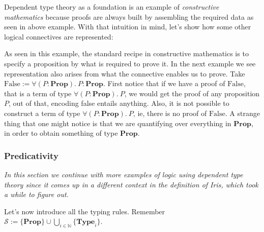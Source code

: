 Dependent type theory as a foundation is an example of \emph{constructive mathematics} because proofs are always built by assembling the required data as seen in
above example. With that intuition in mind, let's show how some other logical connectives are represented:

As seen in this example, the standard recipe in constructive mathematics is to specify a proposition by what is required to prove it. In the next example we
see representation also arises from what the connective enables us to prove. Take $\mathrm{False} := \forall (P : \mathbf{Prop}).\ P : \mathbf{Prop}$.
First notice that if we have a proof of $\mathrm{False}$, that is a term of type $\forall (P : \mathbf{Prop}).\ P$, we would get the proof of any proposition $P$,
out of that, encoding false entails anything. Also, it is not possible to construct a term of type $\forall (P : \mathbf{Prop}).\ P$, ie, there is no proof of $\mathrm{False}$.
A strange thing that one might notice is that we are quantifying over everything in $\mathbf{Prop}$, in order to obtain something of type $\mathbf{Prop}$.

\subsubsection{Predicativity}
\label{sec:predicativity}
\emph{In this section we continue with more examples of logic using dependent type theory since it comes up in a different context in the definition of Iris,
which took a while to figure out.}

Let's now introduce all the typing rules. Remember $\mathcal{S} := \{\mathbf{Prop}\} \cup \bigcup_{i\in\mathbb{N}}\{\mathbf{Type}_i\}$.

